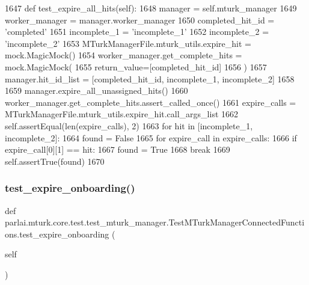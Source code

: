 \begin{DoxyCode}
1647     \textcolor{keyword}{def }test\_expire\_all\_hits(self):
1648         manager = self.mturk\_manager
1649         worker\_manager = manager.worker\_manager
1650         completed\_hit\_id = \textcolor{stringliteral}{'completed'}
1651         incomplete\_1 = \textcolor{stringliteral}{'incomplete\_1'}
1652         incomplete\_2 = \textcolor{stringliteral}{'incomplete\_2'}
1653         MTurkManagerFile.mturk\_utils.expire\_hit = mock.MagicMock()
1654         worker\_manager.get\_complete\_hits = mock.MagicMock(
1655             return\_value=[completed\_hit\_id]
1656         )
1657         manager.hit\_id\_list = [completed\_hit\_id, incomplete\_1, incomplete\_2]
1658 
1659         manager.expire\_all\_unassigned\_hits()
1660         worker\_manager.get\_complete\_hits.assert\_called\_once()
1661         expire\_calls = MTurkManagerFile.mturk\_utils.expire\_hit.call\_args\_list
1662         self.assertEqual(len(expire\_calls), 2)
1663         \textcolor{keywordflow}{for} hit \textcolor{keywordflow}{in} [incomplete\_1, incomplete\_2]:
1664             found = \textcolor{keyword}{False}
1665             \textcolor{keywordflow}{for} expire\_call \textcolor{keywordflow}{in} expire\_calls:
1666                 \textcolor{keywordflow}{if} expire\_call[0][1] == hit:
1667                     found = \textcolor{keyword}{True}
1668                     \textcolor{keywordflow}{break}
1669             self.assertTrue(found)
1670 
\end{DoxyCode}
\mbox{\label{classparlai_1_1mturk_1_1core_1_1test_1_1test__mturk__manager_1_1TestMTurkManagerConnectedFunctions_a14648bdbd74b6ce0fdc3c7a06c1d2625}} 
\subsubsection{\texorpdfstring{test\+\_\+expire\+\_\+onboarding()}{test\_expire\_onboarding()}}
{\footnotesize\ttfamily def parlai.\+mturk.\+core.\+test.\+test\+\_\+mturk\+\_\+manager.\+Test\+M\+Turk\+Manager\+Connected\+Functions.\+test\+\_\+expire\+\_\+onboarding (\begin{DoxyParamCaption}\item[{}]{self }\end{DoxyParamCaption})}



